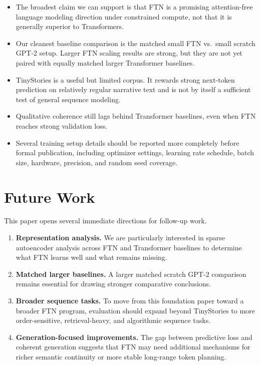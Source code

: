 \documentclass[11pt]{article}
\begin{document}
\begin{itemize}[leftmargin=1.5em]
    \item The broadest claim we can support is that FTN is a promising attention-free language modeling direction under constrained compute, not that it is generally superior to Transformers.
    \item Our cleanest baseline comparison is the matched small FTN vs.\ small scratch GPT-2 setup. Larger FTN scaling results are strong, but they are not yet paired with equally matched larger Transformer baselines.
    \item TinyStories is a useful but limited corpus. It rewards strong next-token prediction on relatively regular narrative text and is not by itself a sufficient test of general sequence modeling.
    \item Qualitative coherence still lags behind Transformer baselines, even when FTN reaches strong validation loss.
    \item Several training setup details should be reported more completely before formal publication, including optimizer settings, learning rate schedule, batch size, hardware, precision, and random seed coverage.
\end{itemize}

\section{Future Work}
This paper opens several immediate directions for follow-up work.

\begin{enumerate}[leftmargin=1.5em]
    \item \textbf{Representation analysis.} We are particularly interested in sparse autoencoder analysis across FTN and Transformer baselines to determine what FTN learns well and what remains missing.
    \item \textbf{Matched larger baselines.} A larger matched scratch GPT-2 comparison remains essential for drawing stronger comparative conclusions.
    \item \textbf{Broader sequence tasks.} To move from this foundation paper toward a broader FTN program, evaluation should expand beyond TinyStories to more order-sensitive, retrieval-heavy, and algorithmic sequence tasks.
    \item \textbf{Generation-focused improvements.} The gap between predictive loss and coherent generation suggests that FTN may need additional mechanisms for richer semantic continuity or more stable long-range token planning.
\end{enumerate}
\end{document}
